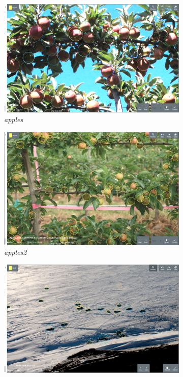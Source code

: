 \begin{figure}[h!]
\begin{subfigure}[t]{0.24\linewidth}
  \includegraphics[width=1.0\linewidth]{figures/annotation/screenshots/apples_big2.png}
  \caption{\emph{apples}}
\end{subfigure}%
\begin{subfigure}[t]{0.24\linewidth}
  \includegraphics[width=1.0\linewidth]{figures/annotation/screenshots/apples2.png}
  \caption{\emph{apples2}}
\end{subfigure}%
 \begin{subfigure}[t]{0.24\linewidth}
  \includegraphics[width=1.0\linewidth]{figures/annotation/screenshots/seals_small2.png}

\end{subfigure}
\end{figure}

